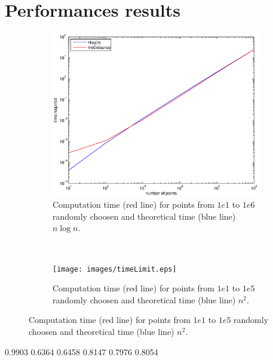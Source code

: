 \section{Performances results}



\begin{figure}
\centering 
\begin{subfigure}[b]{0.4\textwidth}
\includegraphics[width=\textwidth]{images/timeRandom.eps}
\caption{Computation time (red line) for points from $1e1$ to $1e6$ randomly choosen and theoretical time (blue line) $n\log n$.}
\label{fig:timeRandom}
\end{subfigure}
~
\begin{subfigure}[b]{0.4\textwidth}
\texttt{[image: images/timeLimit.eps]}
\caption{Computation time (red line) for points from $1e1$ to $1e5$ randomly choosen and theoretical time (blue line) $n^2$.}
\label{fig:timeLimit}
\end{subfigure}
\end{figure}


 0.9903    0.6364    0.6458    0.8147    0.7976    0.8054